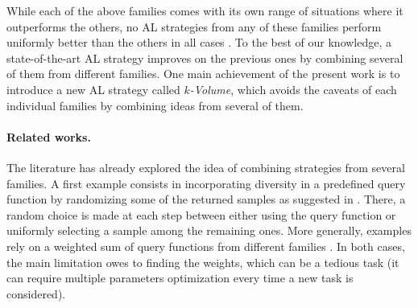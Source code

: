 \documentclass[twoside]{article}
\theoremstyle{definition}
\theoremstyle{remark}
\begin{document}
%
While each of the above families comes with its own range of situations where it outperforms the others, no AL strategies from any of these families perform uniformly better than the others in all cases \citep{munjalRobustReproducibleActive2022,eisenhardtMindGapFramework2026, huExploringLimitationsActive2021,popDeepEnsembleBayesian2018}. 
%
To the best of our knowledge, a state-of-the-art AL strategy improves on the previous ones by combining several of them from different families. %
%
%
One main achievement of the present work is to introduce a new AL strategy called \emph{$k$-Volume}, which avoids the caveats of each individual families by combining ideas from several of them.


\paragraph*{Related works.}
%
The literature has already explored the idea of combining strategies from several families.
%
A first example consists in incorporating diversity in a predefined query function by randomizing some of the returned samples as suggested 
in \citet{bouneffoufContextualBanditActive2014,bouneffoufExponentiatedGradientExploration2016}. %
There, a random choice is made at each step between either using the query function or uniformly selecting a sample among the remaining ones. 
%
More generally, examples rely on a weighted sum of query functions from different families \citep{xuIncorporatingDiversityDensity2007, cebronActiveLearningObject2009,keeQuerybycommitteeImprovementDiversity2018}.
%
In both cases, the main limitation owes to finding the weights, which can be a tedious task (it can require multiple parameters optimization every time a new task is considered).
\end{document}
